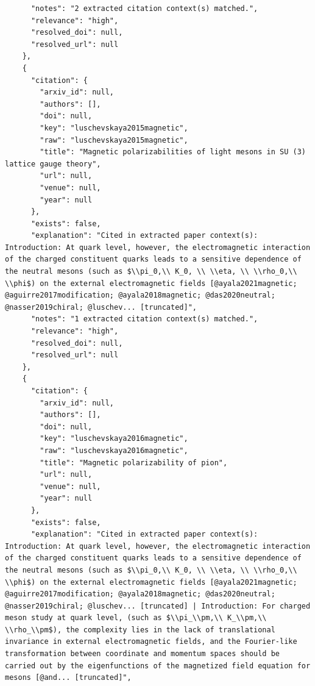 \documentclass[11pt]{article}
\begin{document}
\begin{verbatim}
      "notes": "2 extracted citation context(s) matched.",
      "relevance": "high",
      "resolved_doi": null,
      "resolved_url": null
    },
    {
      "citation": {
        "arxiv_id": null,
        "authors": [],
        "doi": null,
        "key": "luschevskaya2015magnetic",
        "raw": "luschevskaya2015magnetic",
        "title": "Magnetic polarizabilities of light mesons in SU (3) lattice gauge theory",
        "url": null,
        "venue": null,
        "year": null
      },
      "exists": false,
      "explanation": "Cited in extracted paper context(s): Introduction: At quark level, however, the electromagnetic interaction of the charged constituent quarks leads to a sensitive dependence of the neutral mesons (such as $\\pi_0,\\ K_0, \\ \\eta, \\ \\rho_0,\\ \\phi$) on the external electromagnetic fields [@ayala2021magnetic; @aguirre2017modification; @ayala2018magnetic; @das2020neutral; @nasser2019chiral; @luschev... [truncated]",
      "notes": "1 extracted citation context(s) matched.",
      "relevance": "high",
      "resolved_doi": null,
      "resolved_url": null
    },
    {
      "citation": {
        "arxiv_id": null,
        "authors": [],
        "doi": null,
        "key": "luschevskaya2016magnetic",
        "raw": "luschevskaya2016magnetic",
        "title": "Magnetic polarizability of pion",
        "url": null,
        "venue": null,
        "year": null
      },
      "exists": false,
      "explanation": "Cited in extracted paper context(s): Introduction: At quark level, however, the electromagnetic interaction of the charged constituent quarks leads to a sensitive dependence of the neutral mesons (such as $\\pi_0,\\ K_0, \\ \\eta, \\ \\rho_0,\\ \\phi$) on the external electromagnetic fields [@ayala2021magnetic; @aguirre2017modification; @ayala2018magnetic; @das2020neutral; @nasser2019chiral; @luschev... [truncated] | Introduction: For charged meson study at quark level, (such as $\\pi_\\pm,\\ K_\\pm,\\ \\rho_\\pm$), the complexity lies in the lack of translational invariance in external electromagnetic fields, and the Fourier-like transformation between coordinate and momentum spaces should be carried out by the eigenfunctions of the magnetized field equation for mesons [@and... [truncated]",

\end{verbatim}
\end{document}
